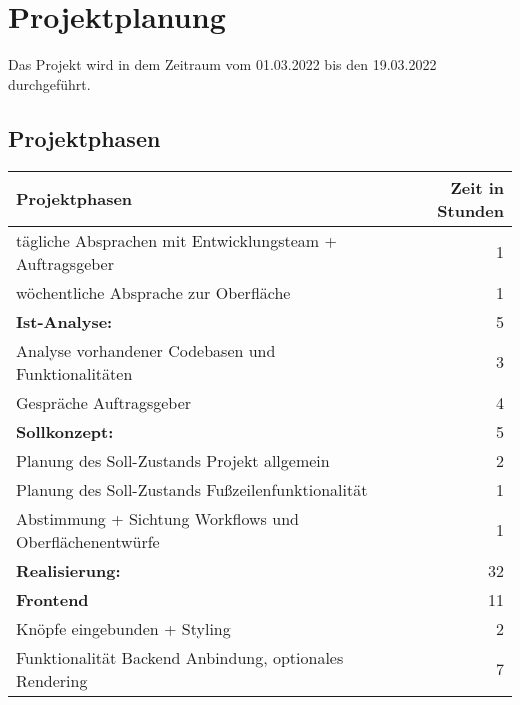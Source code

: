 \newpage
\section{Projektplanung}
\label{projektplanung}
Das Projekt wird in dem Zeitraum vom 01.03.2022 bis den 19.03.2022 durchgeführt. %

\subsection{Projektphasen}
\label{projektphasen}

{
\begin{tabular}{|l|r|}
	\hline
	\textbf{Projektphasen }                                  & \textbf{Zeit in Stunden} \\ \hline
	tägliche Absprachen mit Entwicklungsteam + Auftragsgeber &                        1 \\
	wöchentliche Absprache zur Oberfläche                    &                        1 \\
	\textbf{Ist-Analyse: }                                   &                        5 \\
	Analyse vorhandener Codebasen und Funktionalitäten       &                        3 \\
	Gespräche Auftragsgeber                                  &                        4 \\
	\textbf{Sollkonzept:  }                                  &                        5 \\
	Planung des Soll-Zustands Projekt allgemein              &                        2 \\
	Planung des Soll-Zustands Fußzeilenfunktionalität        &                        1 \\
	Abstimmung + Sichtung Workflows und Oberflächenentwürfe  &                        1 \\
	\textbf{Realisierung: }                                  &                       32 \\
	\textbf{Frontend  }                                      &                       11 \\
	Knöpfe eingebunden + Styling                             &                        2 \\
	Funktionalität Backend Anbindung, optionales Rendering   &                        7 \\

\end{tabular}}
